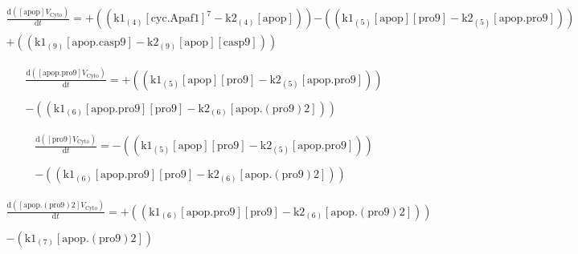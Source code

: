 \documentclass[a4paper,12pt]{article} %
\newcommand{\M}[1]{\mathrm{#1}}
\begin{document}
\begin{equation}
\begin{split}
\frac {\M{d}( {{\M{[apop]}}    {V}_{\M{Cyto}} } ) }  {\M{d}{t} }  =  {  +  (( {{\M{k1}}_{\M{(4)}}    {\M{[cyc.Apaf1]}}^7  -  {\M{k2}}_{\M{(4)}}    {\M{[apop]}} } )) } 
   {  -  (( {{\M{k1}}_{\M{(5)}}    {\M{[apop]}}    {\M{[pro9]}}  -  {\M{k2}}_{\M{(5)}}    {\M{[apop.pro9]}} } )) } \\
   {  +  (( {{\M{k1}}_{\M{(9)}}    {\M{[apop.casp9]}}  -  {\M{k2}}_{\M{(9)}}    {\M{[apop]}}    {\M{[casp9]}} } )) } \end{split}
\end{equation}


\begin{equation}
\begin{split}
\frac {\M{d}( {{\M{[apop.pro9]}}    {V}_{\M{Cyto}} } ) }  {\M{d}{t} }  =  {  +  (( {{\M{k1}}_{\M{(5)}}    {\M{[apop]}}    {\M{[pro9]}}  -  {\M{k2}}_{\M{(5)}}    {\M{[apop.pro9]}} } )) } \\ 
  \\ 
   {  -  (( {{\M{k1}}_{\M{(6)}}    {\M{[apop.pro9]}}    {\M{[pro9]}}  -  {\M{k2}}_{\M{(6)}}    {\M{[apop.(pro9)2]}} } )) } \end{split}
\end{equation}


\begin{equation}
\begin{split}
\frac {\M{d}( {{\M{[pro9]}}    {V}_{\M{Cyto}} } ) }  {\M{d}{t} }  =  {  -  (( {{\M{k1}}_{\M{(5)}}    {\M{[apop]}}    {\M{[pro9]}}  -  {\M{k2}}_{\M{(5)}}    {\M{[apop.pro9]}} } )) } \\ 
  \\ 
   {  -  (( {{\M{k1}}_{\M{(6)}}    {\M{[apop.pro9]}}    {\M{[pro9]}}  -  {\M{k2}}_{\M{(6)}}    {\M{[apop.(pro9)2]}} } )) } \end{split}
\end{equation}

\begin{equation}
\begin{split}
\frac {\M{d}( {{\M{[apop.(pro9)2]}}    {V}_{\M{Cyto}} } ) }  {\M{d}{t} }  =  {  +  (( {{\M{k1}}_{\M{(6)}}    {\M{[apop.pro9]}}    {\M{[pro9]}}  -  {\M{k2}}_{\M{(6)}}    {\M{[apop.(pro9)2]}} } )) } \\ 
  \\ 
   {  -  ( {{\M{k1}}_{\M{(7)}}    {\M{[apop.(pro9)2]}} } ) } \end{split}
\end{equation}
\end{document}
